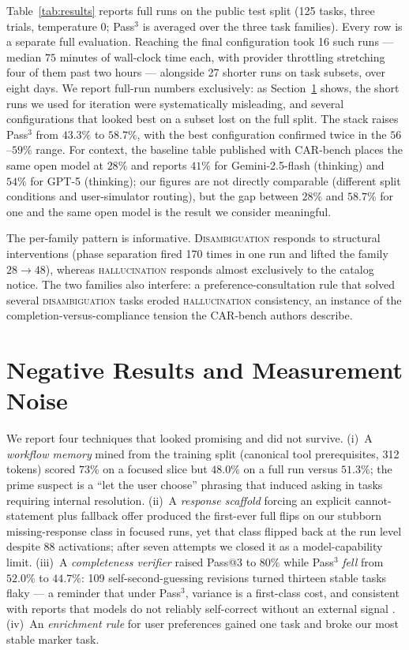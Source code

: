 \documentclass{article}
\begin{document}
Table~\ref{tab:results} reports full runs on the public test split
(125 tasks, three trials, temperature $0$; Pass$^3$ is averaged over
the three task families). Every row is a separate full evaluation.
Reaching the final configuration took 16 such runs --- median $75$
minutes of wall-clock time each, with provider throttling stretching
four of them past two hours --- alongside 27 shorter runs on task
subsets, over eight days. We report full-run numbers exclusively: as
Section~\ref{sec:noise} shows, the short runs we used for iteration
were systematically misleading, and several configurations that looked
best on a subset lost on the full split. The stack raises Pass$^3$
from $43.3\%$ to $58.7\%$, with the best configuration confirmed twice
in the $56$--$59\%$ range. For context, the baseline table published
with CAR-bench \cite{kirmayr2026carbench} places the same open model at
$28\%$ and reports $41\%$ for Gemini-2.5-flash (thinking) and $54\%$
for GPT-5 (thinking); our figures are not directly comparable
(different split conditions and user-simulator routing), but the gap
between $28\%$ and $58.7\%$ for one and the same open model is the
result we consider meaningful.

The per-family pattern is informative. \textsc{Disambiguation}
responds to structural interventions (phase separation fired 170 times
in one run and lifted the family $28 \rightarrow 48$), whereas
\textsc{hallucination} responds almost exclusively to the catalog
notice. The two families also interfere: a preference-consultation
rule that solved several \textsc{disambiguation} tasks eroded
\textsc{hallucination} consistency, an instance of the
completion-versus-compliance tension the CAR-bench authors describe.

\section{Negative Results and Measurement Noise}
\label{sec:noise}

We report four techniques that looked promising and did not survive.
(i)~A \emph{workflow memory} mined from the training split (canonical
tool prerequisites, 312 tokens) scored $73\%$ on a focused slice but
$48.0\%$ on a full run versus $51.3\%$; the prime suspect is a
``let the user choose'' phrasing that induced asking in tasks requiring
internal resolution. (ii)~A \emph{response scaffold} forcing an
explicit cannot-statement plus fallback offer produced the first-ever
full flips on our stubborn missing-response class in focused runs, yet
that class flipped back at the run level despite 88 activations; after
seven attempts we closed it as a model-capability limit.
(iii)~A \emph{completeness verifier} raised Pass@3 to $80\%$ while
Pass$^3$ \emph{fell} from $52.0\%$ to $44.7\%$: 109 self-second-guessing
revisions turned thirteen stable tasks flaky --- a reminder that under
Pass$^3$, variance is a first-class cost, and consistent with reports
that models do not reliably self-correct without an external signal
\cite{huang2024selfcorrect}. (iv)~An \emph{enrichment
rule} for user preferences gained one task and broke our most stable
marker task.
\end{document}
